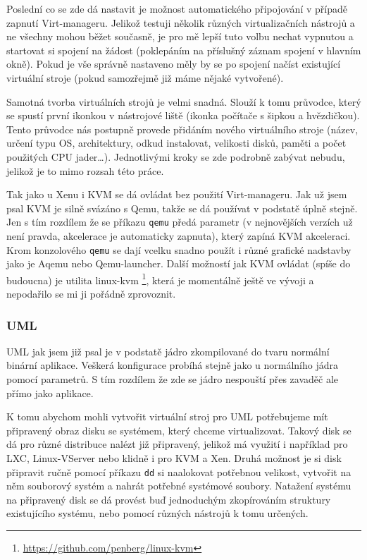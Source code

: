 Poslední co se zde dá nastavit je možnost automatického připojování v případě zapnutí Virt-manageru. Jelikož testuji několik různých virtualizačních nástrojů a ne všechny mohou běžet současně, je pro mě lepší tuto volbu nechat vypnutou a startovat si spojení na žádost (poklepáním na příslušný záznam spojení v hlavním okně). Pokud je vše správně nastaveno měly by se po spojení načíst existující virtuální stroje (pokud samozřejmě již máme nějaké vytvořené).

Samotná tvorba virtuálních strojů je velmi snadná. Slouží k tomu průvodce, který se spustí první ikonkou v nástrojové liště (ikonka počítače s šipkou a hvězdičkou). Tento průvodce nás postupně provede přidáním nového virtuálního stroje (název, určení typu OS, architektury, odkud instalovat, velikosti disků, paměti a počet použitých CPU jader\dots). Jednotlivými kroky se zde podrobně zabývat nebudu, jelikož je to mimo rozsah této práce.

Tak jako u Xenu i KVM se dá ovládat bez použití Virt-manageru. Jak už jsem psal KVM je silně svázáno s Qemu, takže se dá používat v podstatě úplně stejně. Jen s tím rozdílem že se příkazu \texttt{qemu} předá parametr (v nejnovějších verzích už není pravda, akcelerace je automaticky zapnuta), který zapíná KVM akceleraci. Krom konzolového \texttt{qemu} se dají vcelku snadno použít i různé grafické nadstavby jako je Aqemu nebo Qemu-launcher. Další možností jak KVM ovládat (spíše do budoucna) je utilita linux-kvm \footnote{\url{https://github.com/penberg/linux-kvm}}, která je momentálně ještě ve vývoji a nepodařilo se mi ji pořádně zprovoznit.
\subsubsection{UML}
UML jak jsem již psal je v podstatě jádro zkompilované do tvaru normální binární aplikace. Veškerá konfigurace probíhá stejně jako u normálního jádra pomocí parametrů. S tím rozdílem že zde se jádro nespouští přes zavaděč ale přímo jako aplikace.

K tomu abychom mohli vytvořit virtuální stroj pro UML potřebujeme mít připravený obraz disku se systémem, který chceme virtualizovat. Takový disk se dá pro různé distribuce nalézt již připravený, jelikož má využití i například pro LXC, Linux-VServer nebo klidně i pro KVM a Xen. Druhá možnost je si disk připravit ručně pomocí příkazu \texttt{dd} si naalokovat potřebnou velikost, vytvořit na něm souborový systém a nahrát potřebné systémové soubory. Natažení systému na připravený disk se dá provést buď jednoduchým zkopírováním struktury existujícího systému, nebo pomocí různých nástrojů k tomu určených.

